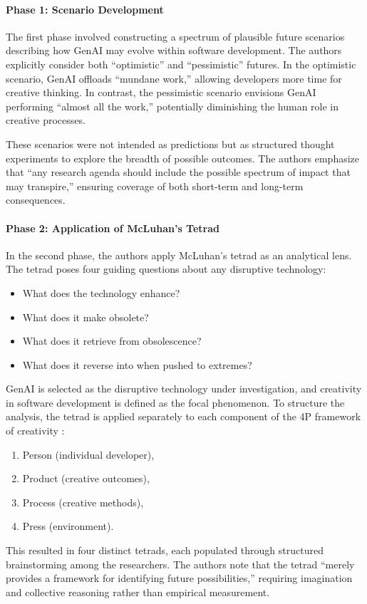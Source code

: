 \paragraph{Phase 1: Scenario Development}
The first phase involved constructing a spectrum of plausible future scenarios describing how GenAI may evolve within software development. The authors explicitly consider both “optimistic” and “pessimistic” futures. In the optimistic scenario, GenAI offloads “mundane work,” allowing developers more time for creative thinking. In contrast, the pessimistic scenario envisions GenAI performing “almost all the work,” potentially diminishing the human role in creative processes.

These scenarios were not intended as predictions but as structured thought experiments to explore the breadth of possible outcomes. The authors emphasize that “any research agenda should include the possible spectrum of impact that may transpire,” ensuring coverage of both short-term and long-term consequences.

\paragraph{Phase 2: Application of McLuhan’s Tetrad}
In the second phase, the authors apply McLuhan’s tetrad \cite{mcluhan1977laws} as an analytical lens. The tetrad poses four guiding questions about any disruptive technology:
\begin{itemize}
    \item What does the technology enhance?
    \item What does it make obsolete?
    \item What does it retrieve from obsolescence?
    \item What does it reverse into when pushed to extremes?
\end{itemize}
GenAI is selected as the disruptive technology under investigation, and creativity in software development is defined as the focal phenomenon. To structure the analysis, the tetrad is applied separately to each component of the 4P framework of creativity \cite{rhodes1961analysis}:
\begin{enumerate}
    \item Person (individual developer),
    \item Product (creative outcomes),
    \item Process (creative methods),
    \item Press (environment).
\end{enumerate}
This resulted in four distinct tetrads, each populated through structured brainstorming among the researchers. The authors note that the tetrad “merely provides a framework for identifying future possibilities,” requiring imagination and collective reasoning rather than empirical measurement.

